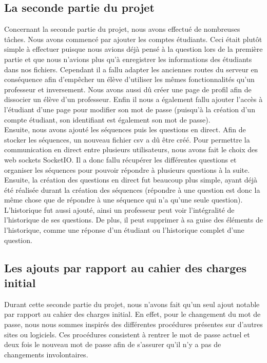 \documentclass[a4paper, 12pt]{article}
\begin{document}
\subsection{La seconde partie du projet}

Concernant la seconde partie du projet, nous avons effectué de nombreuses tâches.
Nous avons commencé par ajouter les comptes étudiants. Ceci était plutôt simple à effectuer puisque nous avions déjà pensé à la question lors de la première partie et que nous n'avions plus qu'à enregistrer les informations des étudiants dans nos fichiers. 
Cependant il a fallu adapter les anciennes routes du serveur en conséquence afin d'empêcher un élève d'utiliser les mêmes fonctionnalités qu'un professeur et inversement.
Nous avons aussi dû créer une page de profil afin de dissocier un élève d'un professeur. 
Enfin il nous a également fallu ajouter l'accès à l'étudiant d'une page pour modifier son mot de passe (puisqu'à la création d'un compte étudiant, son identifiant est également son mot de passe). 
\\Ensuite, nous avons ajouté les séquences puis les questions en direct. 
Afin de stocker les séquences, un nouveau fichier csv a dû être créé. Pour permettre la communication en direct entre plusieurs utilisateurs, nous avons fait le choix des web sockets SocketIO. 
Il a donc fallu récupérer les différentes questions et organiser les séquences pour pouvoir répondre à plusieurs questions à la suite. 
Ensuite, la création des questions en direct fut beaucoup plus simple, ayant déjà été réalisée durant la création des séquences (répondre à une question est donc la même chose que de répondre à une séquence qui n'a qu'une seule question). 
\\L'historique fut aussi ajouté, ainsi un professeur peut voir l'intégralité de l'historique de ses questions.
De plus, il peut supprimer à sa guise des éléments de l'historique, comme une réponse d'un étudiant ou l'historique complet d'une question.

\subsection{Les ajouts par rapport au cahier des charges initial}
Durant cette seconde partie du projet, nous n'avons fait qu'un seul ajout notable par rapport au cahier des charges initial.
En effet, pour le changement du mot de passe, nous nous sommes inspirés des différentes procédures présentes sur d'autres sites ou logiciels. 
Ces procédures consistent à rentrer le mot de passe actuel et deux fois le nouveau mot de passe afin de s'assurer qu'il n'y a pas de changements involontaires.
\end{document}
